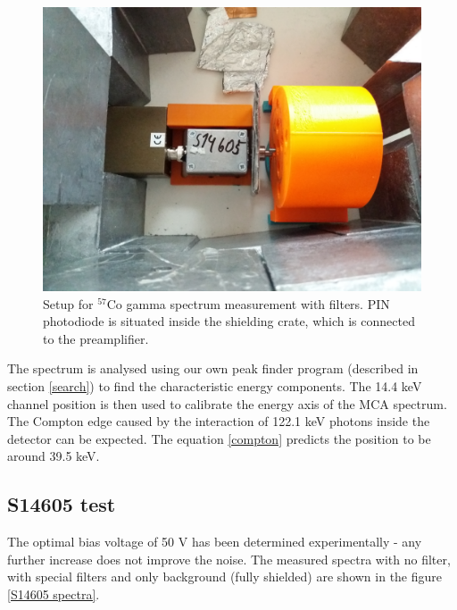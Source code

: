 \begin{figure}[H]
 \centering
 \includegraphics[scale=0.09, angle = 0]{./pictures/ORTECsetup.jpg}
 \caption{Setup for $^{57}$Co gamma spectrum measurement with filters. PIN photodiode  is situated inside the shielding crate, which is connected to the preamplifier.}
 \label{setup}
\end{figure}
The spectrum is analysed using our own peak finder program (described in section \ref{search}) to find the characteristic energy components. The 14.4 keV channel position is then used to calibrate the energy axis of the MCA spectrum. The Compton edge caused by the interaction of 122.1 keV photons inside the detector can be expected. The equation \ref{compton} predicts the position to be around 39.5 keV.
\subsection{S14605 test}
The optimal bias voltage of 50 V has been determined experimentally - any further increase does not improve the noise. The measured spectra with no filter, with special filters and only background (fully shielded) are shown in the figure \ref{S14605 spectra}.


